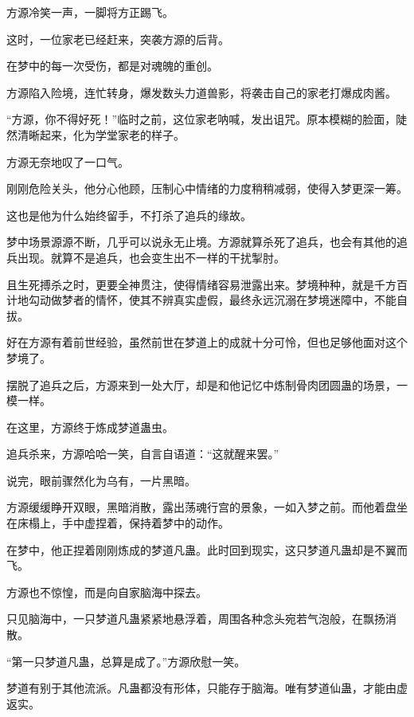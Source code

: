 \begin{this_body}
方源冷笑一声，一脚将方正踢飞。

这时，一位家老已经赶来，突袭方源的后背。

在梦中的每一次受伤，都是对魂魄的重创。

方源陷入险境，连忙转身，爆发数头力道兽影，将袭击自己的家老打爆成肉酱。

“方源，你不得好死！”临时之前，这位家老呐喊，发出诅咒。原本模糊的脸面，陡然清晰起来，化为学堂家老的样子。

方源无奈地叹了一口气。

刚刚危险关头，他分心他顾，压制心中情绪的力度稍稍减弱，使得入梦更深一筹。

这也是他为什么始终留手，不打杀了追兵的缘故。

梦中场景源源不断，几乎可以说永无止境。方源就算杀死了追兵，也会有其他的追兵出现。就算不是追兵，也会变生出不一样的干扰掣肘。

且生死搏杀之时，更要全神贯注，使得情绪容易泄露出来。梦境种种，就是千方百计地勾动做梦者的情怀，使其不辨真实虚假，最终永远沉溺在梦境迷障中，不能自拔。

好在方源有着前世经验，虽然前世在梦道上的成就十分可怜，但也足够他面对这个梦境了。

摆脱了追兵之后，方源来到一处大厅，却是和他记忆中炼制骨肉团圆蛊的场景，一模一样。

在这里，方源终于炼成梦道蛊虫。

追兵杀来，方源哈哈一笑，自言自语道：“这就醒来罢。”

说完，眼前骤然化为乌有，一片黑暗。

方源缓缓睁开双眼，黑暗消散，露出荡魂行宫的景象，一如入梦之前。而他着盘坐在床榻上，手中虚捏着，保持着梦中的动作。

在梦中，他正捏着刚刚炼成的梦道凡蛊。此时回到现实，这只梦道凡蛊却是不翼而飞。

方源也不惊惶，而是向自家脑海中探去。

只见脑海中，一只梦道凡蛊紧紧地悬浮着，周围各种念头宛若气泡般，在飘扬消散。

“第一只梦道凡蛊，总算是成了。”方源欣慰一笑。

梦道有别于其他流派。凡蛊都没有形体，只能存于脑海。唯有梦道仙蛊，才能由虚返实。

\end{this_body}


